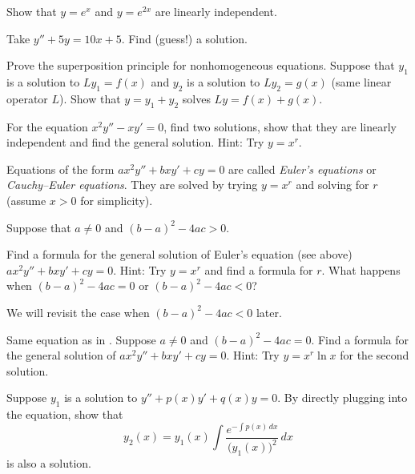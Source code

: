 \begin{exercise}
Show that $y=e^x$ and $y=e^{2x}$ are linearly independent.
\end{exercise}

\begin{exercise}
Take $y'' + 5 y = 10 x + 5$.  Find (guess!) a solution.
\end{exercise}

\begin{exercise}
Prove the superposition principle for nonhomogeneous equations.  Suppose that
$y_1$ is a solution to $L y_1 = f(x)$ and $y_2$ is a solution to
$L y_2 = g(x)$ (same linear operator $L$).  Show that $y = y_1+y_2$ solves
$Ly = f(x) + g(x)$.
\end{exercise}

\begin{exercise}
For the equation $x^2 y'' - x y' = 0$, find two solutions, show that they
are linearly independent and find the general solution.
Hint: Try $y = x^r$.
\end{exercise}

\pagebreak[2]
Equations of the form $a x^2 y'' + b x y' + c y = 0$ are called
\emph{Euler's equations} or
\emph{Cauchy--Euler equations}.
They are solved by trying
$y=x^r$ and solving for $r$ (assume $x > 0$ for simplicity).

\begin{exercise} \label{sol:eulerex}
\pagebreak[2]
Suppose that $a \neq 0$ and ${(b-a)}^2-4ac > 0$.
\begin{tasks}
\task Find a formula for the general solution
of Euler's equation (see above) $a x^2 y'' + b x y' + c y = 0$.
Hint: Try $y=x^r$ and find a formula for $r$.
\task What happens when ${(b-a)}^2-4ac = 0$ or ${(b-a)}^2-4ac < 0$?
\end{tasks}
\end{exercise}

We will revisit the case when ${(b-a)}^2-4ac < 0$ later.

\begin{exercise} \label{sol:eulerexln}
Same equation as in .
Suppose $a \neq 0$ and ${(b-a)}^2-4ac = 0$.  Find a formula for the general solution
of $a x^2 y'' + b x y' + c y = 0$.  Hint: Try $y=x^r \ln x$ for the second
solution.
\end{exercise}


\begin{exercise} \label{exercise:reductionoforder}
Suppose $y_1$ is a solution to $y'' + p(x) y' + q(x) y = 0$.
By directly plugging into the equation,
show that
\begin{equation*}
y_2(x) = y_1(x) \int \frac{e^{-\int p(x)\,dx}}{{\bigl(y_1(x)\bigr)}^2} \,dx
\end{equation*}
is also a solution.
\end{exercise}

